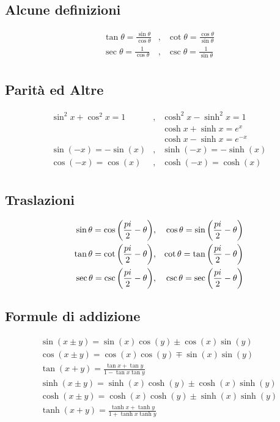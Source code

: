 \documentclass[10pt,a4paper]{article}
\begin{document}
\begin{multicols}{2}
  \subsection*{Alcune definizioni}
  \begin{align*}
    \tan\theta = \frac{\sin\theta}{\cos\theta} & , & \cot\theta = \frac{\cos\theta}{\sin\theta} \\
    \sec\theta = \frac{1}{\cos\theta}          & , & \csc\theta = \frac{1}{\sin\theta}          \\
  \end{align*}

  \subsection*{Parità ed Altre}
  \begin{align*}
    \sin^2 x + \cos^2 x = 1 & , & \cosh^2 x - \sinh^2 x = 1  \\
                            &   & \cosh x + \sinh x = e^x    \\
                            &   & \cosh x - \sinh x = e^{-x} \\
    \sin(-x) = - \sin(x)    & , & \sinh(-x) = - \sinh(x)     \\
    \cos(-x) = \cos(x)      & , & \cosh(-x) = \cosh(x)       \\
  \end{align*}
  
  \subsection*{Traslazioni}
  \begin{align*}
    \sin\theta = \cos\left({\frac{pi}{2} - \theta}\right) & , & \cos\theta = \sin\left({\frac{pi}{2} - \theta}\right) \\
    \tan\theta = \cot\left({\frac{pi}{2} - \theta}\right) & , & \cot\theta = \tan\left({\frac{pi}{2} - \theta}\right) \\
    \sec\theta = \csc\left({\frac{pi}{2} - \theta}\right) & , & \csc\theta = \sec\left({\frac{pi}{2} - \theta}\right) \\
  \end{align*}

  \subsection*{Formule di addizione}
  \begin{align*}
    \sin(x \pm y) = \sin(x) \cos(y) \pm \cos(x) \sin(y)          \\
    \cos(x \pm y) = \cos(x) \cos(y) \mp \sin(x) \sin(y)          \\
    \tan(x + y) = \frac{\tan x + \tan y}{1 - \tan x \tan y}      \\
    \sinh(x \pm y) = \sinh(x) \cosh(y) \pm \cosh(x) \sinh(y)     \\
    \cosh(x \pm y) = \cosh(x) \cosh(y) \pm \sinh(x) \sinh(y)     \\
    \tanh(x + y) = \frac{\tanh x + \tanh y}{1 + \tanh x \tanh y} \\
  \end{align*}


\end{multicols}
\end{document}
